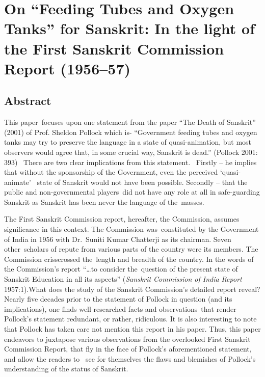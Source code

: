 \chapter[On “Feeding Tubes and Oxygen Tanks” for Sanskrit....]{On “Feeding Tubes and Oxygen Tanks” for Sanskrit: 
In the light of the First Sanskrit Commission Report (1956--57)}\label{chapter6}


\section*{Abstract}
 
This paper focuses upon one statement from the paper “The Death of Sanskrit” (2001) of Prof. Sheldon Pollock which is- “Government feeding tubes and oxygen tanks may try to preserve the language in a state of quasi-animation, but most observers would agree that, in some crucial way, Sanskrit is dead.” (Pollock 2001: 393)  There are two clear implications from this statement.  Firstly – he implies that without the sponsorship of the Government, even the perceived ‘quasi-animate’  state of Sanskrit would not have been possible. Secondly – that the public and non-governmental players did not have any role at all in safe-guarding Sanskrit as Sanskrit has been never the language of the masses.  

The First Sanskrit Commission report, hereafter, the Commission, assumes significance in this context. The Commission was constituted by the Government of India in 1956 with Dr.\ Suniti Kumar Chatterji as its chairman. Seven other scholars of repute from various parts of the country were its members. The Commission crisscrossed the length and breadth of the country. In the words of the Commission’s report “…to consider the question of the present state of Sanskrit Education in all its aspects” ({\sl Sanskrit Commission of India Report} 1957:1).What does the study of the Sanskrit Commission’s detailed report reveal? Nearly five decades prior to the statement of Pollock in question (and its implications), one finds well researched facts and observations that render Pollock’s statement redundant, or rather, ridiculous. It is also interesting to note that Pollock has taken care not mention this report in his paper. Thus, this paper endeavors to juxtapose various observations from the overlooked First Sanskrit  Commission Report, that fly in the face of Pollock’s aforementioned statement, and allow the readers to  see for themselves the flaws and blemishes of Pollock’s understanding of the status of Sanskrit.

